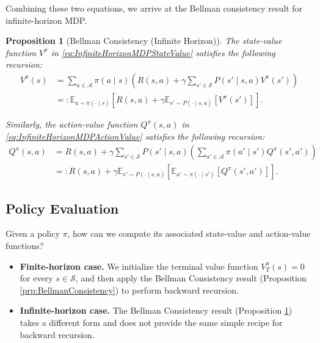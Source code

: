 \documentclass[
]{book}
\newtheorem{proposition}{Proposition}[chapter]
\theoremstyle{definition}
\theoremstyle{definition}
\theoremstyle{definition}
\theoremstyle{definition}
\theoremstyle{remark}
\begin{document}
Combining these two equations, we arrive at the Bellman consistency result for infinite-horizon MDP.

\begin{proposition}[Bellman Consistency (Infinite Horizon)]
\protect\hypertarget{prp:BellmanConsistencyInfiniteHorizon}{}\label{prp:BellmanConsistencyInfiniteHorizon}The state-value function \(V^{\pi}\) in \eqref{eq:InfiniteHorizonMDPStateValue} satisfies the following recursion:
\begin{equation}
\begin{split}
V^{\pi} (s) & = \sum_{a \in \mathcal{A}} \pi (a\mid s) \left( R(s,a) + \gamma \sum_{s' \in \mathcal{S}} P(s' \mid s, a) V^{\pi} (s') \right) \\
    & =: \mathbb{E}_{a \sim \pi(\cdot \mid s)} \left[ R(s, a) + \gamma \mathbb{E}_{s' \sim P(\cdot \mid s, a)} [V^{\pi}(s')] \right].
\end{split}
\label{eq:BellmanConsistency-InfiniteHorizon-State-Value}
\end{equation}

Similarly, the action-value function \(Q^{\pi}(s,a)\) in \eqref{eq:InfiniteHorizonMDPActionValue} satisfies the following recursion:
\begin{equation}
\begin{split}
Q^{\pi} (s, a) & = R(s,a) + \gamma \sum_{s' \in \mathcal{S}} P(s' \mid s, a) \left( \sum_{a' \in \mathcal{A}} \pi(a' \mid s') Q^{\pi}(s', a')\right) \\
& =: R(s, a) + \gamma \mathbb{E}_{s' \sim P(\cdot \mid s, a)} \left[\mathbb{E}_{a' \sim \pi(\cdot \mid s')} [Q^{\pi}(s', a')] \right].
\end{split}
\label{eq:BellmanConsistency-InfiniteHorizon-Action-Value}
\end{equation}
\end{proposition}

\subsection{Policy Evaluation}\label{policy-evaluation-1}

Given a policy \(\pi\), how can we compute its associated state-value and action-value functions?

\begin{itemize}
\item
  \textbf{Finite-horizon case.} We initialize the terminal value function \(V_T^{\pi}(s) = 0\) for every \(s \in \mathcal{S}\), and then apply the Bellman Consistency result (Proposition \ref{prp:BellmanConsistency}) to perform backward recursion.
\item
  \textbf{Infinite-horizon case.} The Bellman Consistency result (Proposition \ref{prp:BellmanConsistencyInfiniteHorizon}) takes a different form and does not provide the same simple recipe for backward recursion.
\end{itemize}
\end{document}
